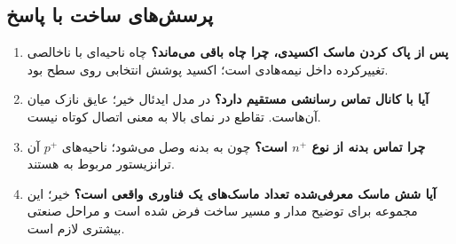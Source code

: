 \subsection{پرسش‌های ساخت با پاسخ}
\begin{enumerate}
\item \textbf{پس از پاک کردن ماسک اکسیدی، چرا چاه باقی می‌ماند؟}
چاه ناحیه‌ای با ناخالصی تغییرکرده داخل نیمه‌هادی است؛ اکسید پوشش انتخابی روی سطح بود.
\item \textbf{آیا  با کانال تماس رسانشی مستقیم دارد؟}
در مدل ایدئال خیر؛ عایق نازک میان آن‌هاست. تقاطع در نمای بالا به معنی اتصال کوتاه نیست.
\item \textbf{چرا تماس بدنه  از نوع \(n^+\) است؟}
چون به بدنه  وصل می‌شود؛ ناحیه‌های \(p^+\) آن ترانزیستور مربوط به  هستند.
\item \textbf{آیا شش ماسک معرفی‌شده تعداد ماسک‌های یک فناوری واقعی است؟}
خیر؛ این مجموعه برای توضیح مدار و مسیر ساخت فرض شده است و مراحل صنعتی بیشتری لازم است.
\end{enumerate}
